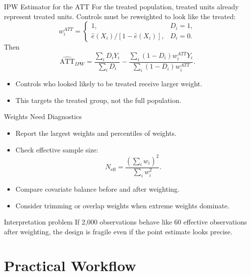 \documentclass[11pt,aspectratio=169]{beamer}
\newcommand{\ATT}{\mathrm{ATT}}
\begin{document}
\begin{frame}{IPW Estimator for the ATT}
  For the treated population, treated units already represent treated units.
  Controls must be reweighted to look like the treated:
  \[
    w_i^{ATT}
    =
    \begin{cases}
      1, & D_i=1,\\
      \widehat{e}(X_i)/[1-\widehat{e}(X_i)], & D_i=0.
    \end{cases}
  \]
  Then
  \[
    \widehat{\ATT}_{IPW}
    =
    \frac{\sum_i D_iY_i}{\sum_iD_i}
    -
    \frac{\sum_i (1-D_i)w_i^{ATT}Y_i}{\sum_i(1-D_i)w_i^{ATT}}.
  \]
  \begin{itemize}
    \item Controls who looked likely to be treated receive larger weight.
    \item This targets the treated group, not the full population.
  \end{itemize}
\end{frame}

\begin{frame}{Weights Need Diagnostics}
  \small
  \begin{itemize}
    \item Report the largest weights and percentiles of weights.
    \item Check effective sample size:
      \[
        N_{\mathrm{eff}}=\frac{(\sum_i w_i)^2}{\sum_i w_i^2}.
      \]
    \item Compare covariate balance before and after weighting.
    \item Consider trimming or overlap weights when extreme weights dominate.
  \end{itemize}
  \begin{block}{Interpretation problem}
    If 2,000 observations behave like 60 effective observations after weighting, the design is fragile even if the point estimate looks precise.
  \end{block}
\end{frame}

\section{Practical Workflow}
\end{document}
